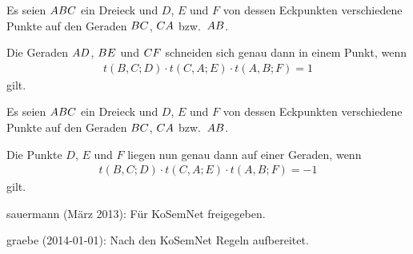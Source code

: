 \documentclass[11pt,a4paper]{article}
\begin{document}
\begin{satz} 
  Es seien $\ktriangle*{ABC}$ ein Dreieck und $D$, $E$ und $F$ von dessen
  Eckpunkten verschiedene Punkte auf den Geraden ${\mathnormal{BC}}$, ${\mathnormal{CA}}$
  bzw.\ ${\mathnormal{AB}}$. 

  Die Geraden ${\mathnormal{AD}}$, ${\mathnormal{BE}}$ und ${\mathnormal{CF}}$ schneiden sich genau
  dann in einem Punkt, wenn 
  \begin{gather*}
    t(B,C;D)\cdot t(C,A;E)\cdot t(A,B;F) =1
  \end{gather*}
  gilt.
\end{satz}
\begin{satz} 
  Es seien $\ktriangle*{ABC}$ ein Dreieck und $D$, $E$ und $F$ von dessen
  Eckpunkten verschiedene Punkte auf den Geraden ${\mathnormal{BC}}$, ${\mathnormal{CA}}$
  bzw.\ ${\mathnormal{AB}}$.  

  Die Punkte $D$, $E$ und $F$ liegen nun genau dann auf einer Geraden, wenn
  \begin{gather*}
    t(B,C;D)\cdot t(C,A;E)\cdot t(A,B;F) =-1
  \end{gather*}
  gilt.
\end{satz}

\begin{attribution}
sauermann (März 2013): Für KoSemNet freigegeben.

graebe (2014-01-01): Nach den KoSemNet Regeln aufbereitet.
\end{attribution}
\end{document}

